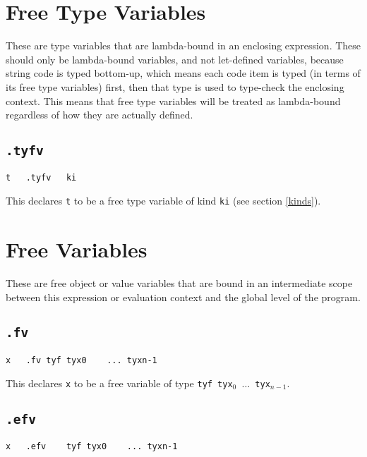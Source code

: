 \documentclass{report}
\newcommand\stringcode[1]{\texttt{#1}}
\begin{document}
\section{Free Type Variables}
\label{type_fv}

These are type variables that are lambda-bound in an enclosing expression.
These should only be lambda-bound variables, and not let-defined variables, because string code is typed bottom-up,
which means each code item is typed (in terms of its free type variables) first, then that type is used to type-check the enclosing context.
This means that free type variables will be treated as lambda-bound regardless of how they are actually defined.

\subsection{\stringcode{.tyfv}}

\begin{verbatim}
t	.tyfv	ki
\end{verbatim}

This declares \stringcode{t} to be a free type variable of kind \stringcode{ki} (see section \ref{kinds}).

\section{Free Variables}
\label{value_fv}

These are free object or value variables that are bound in an intermediate scope between this expression or evaluation context and the global level of the program.

\subsection{\stringcode{.fv}}

\begin{verbatim}
x	.fv	tyf	tyx0	...	tyxn-1
\end{verbatim}

This declares \stringcode{x} to be a free variable of type \stringcode{tyf tyx$_0$ $\ldots$ tyx$_{n-1}$}.

\subsection{\stringcode{.efv}}

\begin{verbatim}
x	.efv	tyf	tyx0	...	tyxn-1
\end{verbatim}
\end{document}
